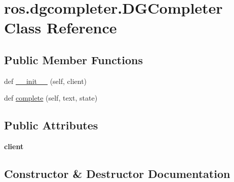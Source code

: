 \hypertarget{classros_1_1dgcompleter_1_1DGCompleter}{}\section{ros.\+dgcompleter.\+D\+G\+Completer Class Reference}
\label{classros_1_1dgcompleter_1_1DGCompleter}
\subsection*{Public Member Functions}
\begin{DoxyCompactItemize}
\item 
def \hyperlink{classros_1_1dgcompleter_1_1DGCompleter_a3a83ed364b26688ebccc5aa4dfca6886}{\+\_\+\+\_\+init\+\_\+\+\_\+} (self, client)
\item 
def \hyperlink{classros_1_1dgcompleter_1_1DGCompleter_a0662ed6ab4e56fb2a828c5577e03b41e}{complete} (self, text, state)
\end{DoxyCompactItemize}
\subsection*{Public Attributes}
\begin{DoxyCompactItemize}
\item 
{\bfseries client}\hypertarget{classros_1_1dgcompleter_1_1DGCompleter_afcab03fb8dcc2ed3b536d76369037cde}{}\label{classros_1_1dgcompleter_1_1DGCompleter_afcab03fb8dcc2ed3b536d76369037cde}

\end{DoxyCompactItemize}


\subsection{Constructor \& Destructor Documentation}
